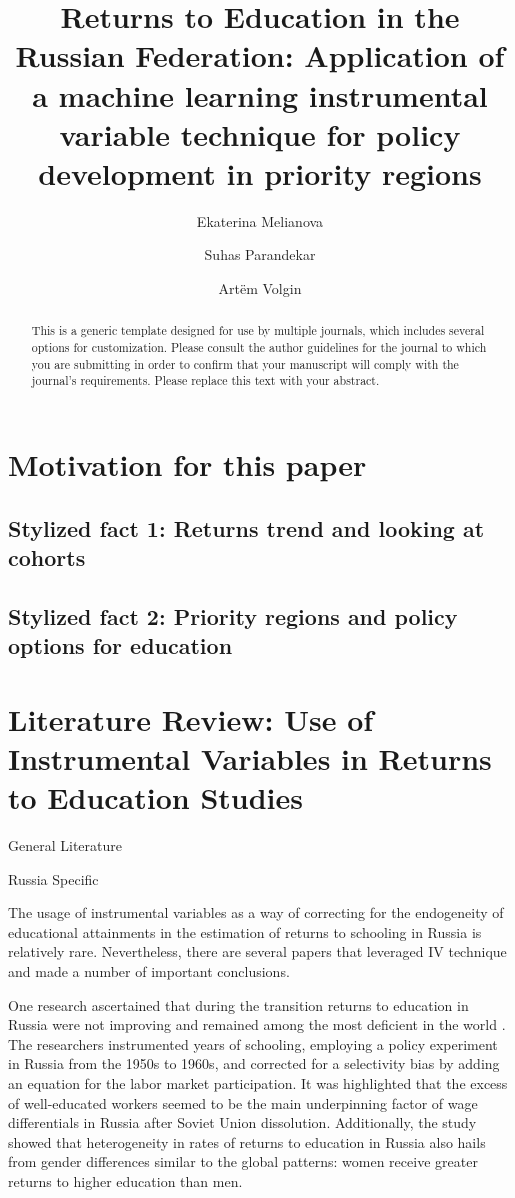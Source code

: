 \documentclass[alpha-refs]{wiley-article-04t}
\title{Returns to Education in the Russian Federation: Application of a machine learning instrumental variable technique for policy development in priority regions}
\author[*]{Ekaterina Melianova}
\author[*]{\hspace{-1em}Suhas Parandekar}
\author[*]{\hspace{-1em}Art\"{e}m Volgin}
\affil[*]{Education Global Practice, Europe and Central Asia}
\begin{document}
\maketitle

\begin{abstract}
This is a generic template designed for use by multiple journals, which includes several options for customization. Please consult the author guidelines for the journal to which you are submitting in order to confirm that your manuscript will comply with the journal's requirements. Please replace this text with your abstract.

\end{abstract}


\section{Motivation for this paper}

\subsection{Stylized fact 1: Returns trend and looking at cohorts}

\subsection{Stylized fact 2: Priority regions and policy options for education}

\lipsum[1]

\section{Literature Review: Use of Instrumental Variables in Returns to Education Studies}

General Literature


Russia Specific


The usage of instrumental variables as a way of correcting for the endogeneity of educational attainments in the estimation of returns to schooling in Russia is relatively rare. Nevertheless, there are several papers that leveraged IV technique and made a number of important conclusions.

One research ascertained that during the transition returns to education in Russia were not improving and remained among the most deficient in the world \citep{cheidvasser_educated_2007}. The researchers instrumented years of schooling, employing a policy experiment in Russia from the 1950s to 1960s, and corrected for a selectivity bias by adding an equation for the labor market participation. It was highlighted that the excess of well-educated workers seemed to be the main underpinning factor of wage differentials in Russia after Soviet Union dissolution. Additionally, the study showed that heterogeneity in rates of returns to education in Russia also hails from gender differences similar to the global patterns: women receive greater returns to higher education than men.
\end{document}

